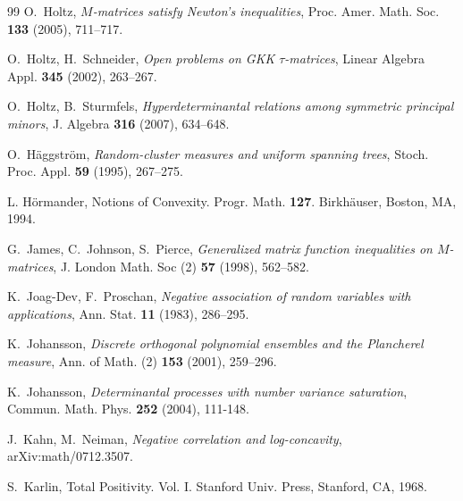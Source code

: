 \documentclass[10pt,reqno]{amsart}
\theoremstyle{plain}
\theoremstyle{definition}
\theoremstyle{remark}
\begin{document}
\begin{thebibliography}{99}
O.~Holtz, {\em $M$-matrices satisfy Newton's inequalities}, Proc. Amer. Math. 
Soc. {\bf 133} (2005), 711--717.

O.~Holtz, H.~Schneider, {\em Open problems on GKK $\tau$-matrices}, Linear 
Algebra Appl. {\bf 345} (2002), 263--267. 

O.~Holtz, B.~Sturmfels, {\em Hyperdeterminantal relations among symmetric
principal minors}, J. Algebra {\bf 316} (2007), 634--648.

O.~H\"aggstr\"om, {\em Random-cluster measures and uniform spanning trees},
Stoch. Proc. Appl.  {\bf 59} (1995), 267--275.

L. H\"ormander, Notions of Convexity. Progr. Math. {\bf 127}. 
Birkh\"auser, Boston, MA, 1994.

G.~James, C.~Johnson, S.~Pierce, {\em Generalized matrix function 
inequalities on $M$-matrices}, J. London Math. Soc (2) {\bf 57} (1998), 
562--582.

K.~Joag-Dev, F.~Proschan, {\em Negative association of random variables with
applications}, Ann. Stat. {\bf 11} (1983), 286--295.

K.~Johansson, {\em Discrete orthogonal polynomial ensembles and the Plancherel
measure}, Ann. of Math. (2) {\bf 153} (2001), 259--296.

K.~Johansson, {\em Determinantal processes with number variance saturation},
Commun. Math. Phys. {\bf 252} (2004), 111-148.

J.~Kahn, M.~Neiman, {\em Negative correlation and log-concavity}, 
arXiv:math/0712.3507.

S.~Karlin, Total Positivity. Vol. I. Stanford Univ. Press, Stanford, CA, 
1968.





\end{thebibliography}
\end{document}
